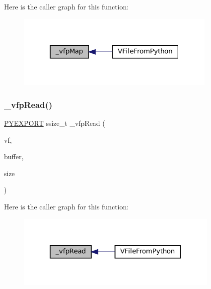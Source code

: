 Here is the caller graph for this function\+:
\nopagebreak
\begin{figure}[H]
\begin{center}
\leavevmode
\includegraphics[width=273pt]{vfs-py_8h_aaa63f5159220e10a3deeb11dbed544e2_icgraph}
\end{center}
\end{figure}
\mbox{\label{vfs-py_8h_aa6b61d85bba817d5ccc6b31c15440735}} 
\subsubsection{\texorpdfstring{\+\_\+vfp\+Read()}{\_vfpRead()}}
{\footnotesize\ttfamily \mbox{\hyperlink{pycommon_8h_a68eebefd6b08dcf3f0bc2b2fe43a32b6}{P\+Y\+E\+X\+P\+O\+RT}} ssize\+\_\+t \+\_\+vfp\+Read (\begin{DoxyParamCaption}\item[{struct V\+File $\ast$}]{vf,  }\item[{void $\ast$}]{buffer,  }\item[{size\+\_\+t}]{size }\end{DoxyParamCaption})}

Here is the caller graph for this function\+:
\nopagebreak
\begin{figure}[H]
\begin{center}
\leavevmode
\includegraphics[width=277pt]{vfs-py_8h_aa6b61d85bba817d5ccc6b31c15440735_icgraph}
\end{center}
\end{figure}
\mbox{\label{vfs-py_8h_a380762c464d50d10fdc08748f362e3e5}} 
